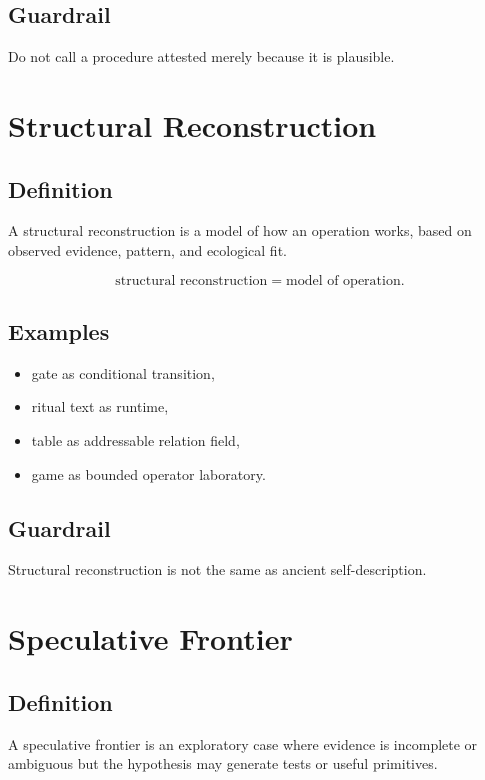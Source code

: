 \documentclass[11pt]{book}
\begin{document}
\subsection*{Guardrail}

Do not call a procedure attested merely because it is plausible.

\section{Structural Reconstruction}

\subsection*{Definition}

A structural reconstruction is a model of how an operation works, based on observed evidence, pattern, and ecological fit.

\[
\text{structural reconstruction} = \text{model of operation}.
\]

\subsection*{Examples}

\begin{itemize}
    \item gate as conditional transition,
    \item ritual text as runtime,
    \item table as addressable relation field,
    \item game as bounded operator laboratory.
\end{itemize}

\subsection*{Guardrail}

Structural reconstruction is not the same as ancient self-description.

\section{Speculative Frontier}

\subsection*{Definition}

A speculative frontier is an exploratory case where evidence is incomplete or ambiguous but the hypothesis may generate tests or useful primitives.
\end{document}
